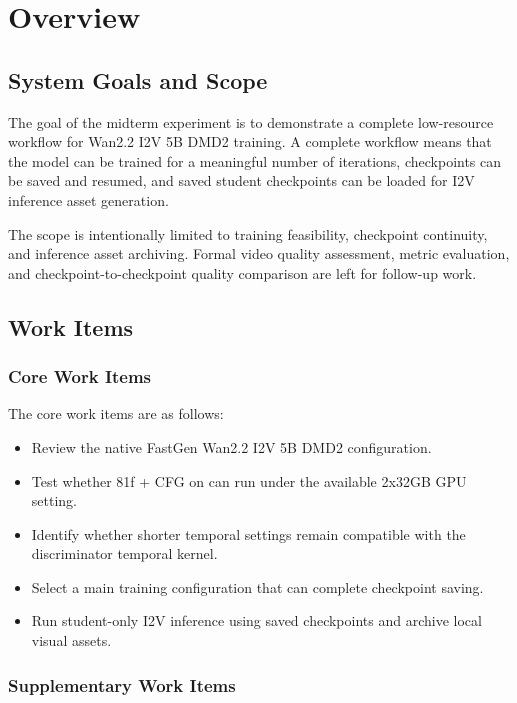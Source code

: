 \documentclass[12pt,a4paper]{article}
\begin{document}
\section{Overview}

\subsection{System Goals and Scope}

The goal of the midterm experiment is to demonstrate a complete low-resource workflow for Wan2.2 I2V 5B DMD2 training. A complete workflow means that the model can be trained for a meaningful number of iterations, checkpoints can be saved and resumed, and saved student checkpoints can be loaded for I2V inference asset generation.

The scope is intentionally limited to training feasibility, checkpoint continuity, and inference asset archiving. Formal video quality assessment, metric evaluation, and checkpoint-to-checkpoint quality comparison are left for follow-up work.

\subsection{Work Items}

\subsubsection{Core Work Items}

The core work items are as follows:

\begin{itemize}
  \item Review the native FastGen Wan2.2 I2V 5B DMD2 configuration.
  \item Test whether 81f + CFG on can run under the available 2x32GB GPU setting.
  \item Identify whether shorter temporal settings remain compatible with the discriminator temporal kernel.
  \item Select a main training configuration that can complete checkpoint saving.
  \item Run student-only I2V inference using saved checkpoints and archive local visual assets.
\end{itemize}

\subsubsection{Supplementary Work Items}
\end{document}
